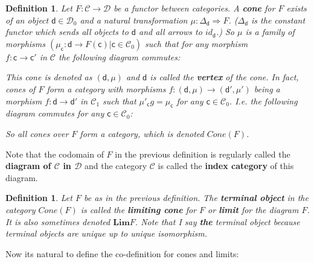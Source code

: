 \documentclass{article}
\newcommand{\cat}[1]{\mathcal{#1}} %
\newcommand{\cato}[1]{\cat{#1}_0} %
\newcommand{\catm}[1]{\cat{#1}_1} %
\newcommand{\ob}[1]{\mathsf{#1}} %
\newcommand{\limc}[1]{\bm{Lim}#1}
\newtheorem{definition}[theorem]{Definition}
\begin{document}
\begin{definition}
	Let $F: \cat{C} \rightarrow \cat{D}$ be a functor between categories. A \textbf{cone} for $F$ exists of an object $\ob{d} \in \cato{D}$ and a natural transformation $\mu: \Delta_\ob{d} \Rightarrow F$.
	($\Delta_\ob{d}$ is the constant functor which sends all objects to $\ob{d}$ and all arrows to $id_{\ob{d}}$.)
	So $\mu$ is a family of morphisms $(\mu_\ob{c}: \ob{d} \rightarrow F(\ob{c})| \ob{c} \in \cato{C})$ such that for any morphism \\
	$f: \ob{c} \rightarrow \ob{c}'$ in $\cat{C}$ the following diagram commutes:
	This cone is denoted as $(\ob{d}, \mu)$ and $\ob{d}$ is called the \textbf{vertex} of the cone.
	In fact, cones of $F$ form a category with morphisms $f: (\ob{d}, \mu) \rightarrow (\ob{d}', \mu')$ being a morphism $f: \ob{d} \rightarrow \ob{d}'$ in $\catm{C}$ such that $\mu'_\ob{c}g = \mu_\ob{c}$
	for any $\ob{c} \in \cato{C}$. I.e. the following diagram commutes for any $\ob{c} \in \cato{C}$:
	So all cones over $F$ form a category, which is denoted $Cone(F)$.
\end{definition}

Note that the codomain of $F$ in the previous definition is regularly called the \textbf{diagram of $\cat{C}$ in $\cat{D}$} and the category $\cat{C}$ is called the \textbf{index category} of this diagram.

\begin{definition}
	Let $F$ be as in the previous definition. The \textbf{terminal object} in the category $Cone(F)$ is called the \textbf{limiting cone} for $F$ or \textbf{limit} for the diagram $F$. It is also sometimes denoted $\limc{F}$.
	Note that I say \textbf{the} terminal object because terminal objects are unique up to unique isomorphism.

\end{definition}

Now its natural to define the co-definition for cones and limits:
\end{document}
